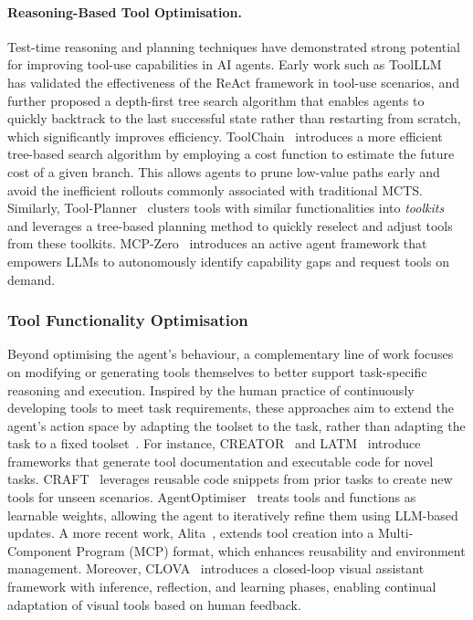 \documentclass[]{selfevolagent}
\theoremstyle{plain}
\theoremstyle{definition}
\theoremstyle{remark}
\begin{document}
\paragraph{Reasoning-Based Tool Optimisation.} 
Test-time reasoning and planning techniques have demonstrated strong potential for improving tool-use capabilities in AI agents. Early work such as ToolLLM~\citep{qin2024toolllm} has validated the effectiveness of the ReAct \citep{yao2023react} framework in tool-use scenarios, and further proposed a depth-first tree search algorithm that enables agents to quickly backtrack to the last successful state rather than restarting from scratch, which significantly improves efficiency. 
ToolChain~\citep{zhuang2024toolchain} introduces a more efficient tree-based search algorithm by employing a cost function to estimate the future cost of a given branch. This allows agents to prune low-value paths early and avoid the inefficient rollouts commonly associated with traditional MCTS. Similarly, Tool-Planner~\citep{liu2025toolplanner} clusters tools with similar functionalities into \textit{toolkits} and leverages a tree-based planning method to quickly reselect and adjust tools from these toolkits. MCP-Zero~\citep{fei2025mcp} introduces an active agent framework that empowers LLMs to autonomously identify capability gaps and request tools on demand.  

\subsubsection{Tool Functionality Optimisation}
Beyond optimising the agent's behaviour, a complementary line of work focuses on modifying or generating tools themselves to better support task-specific reasoning and execution. Inspired by the human practice of continuously developing tools to meet task requirements, these approaches aim to extend the agent's action space by adapting the toolset to the task, rather than adapting the task to a fixed toolset~\citep{wang2024trove}. For instance, CREATOR~\citep{qian2023creator} and LATM~\citep{cai2024large} introduce frameworks that generate tool documentation and executable code for novel tasks. CRAFT~\citep{yuan2024craft} leverages reusable code snippets from prior tasks to create new tools for unseen scenarios. AgentOptimiser~\citep{zhang2024offline} treats tools and functions as learnable weights, allowing the agent to iteratively refine them using LLM-based updates. A more recent work, Alita~\citep{qiu2025alita}, extends tool creation into a Multi-Component Program (MCP) format, which enhances reusability and environment management. Moreover, CLOVA~\citep{gao2024clova} introduces a closed-loop visual assistant framework with inference, reflection, and learning phases, enabling continual adaptation of visual tools based on human feedback. %
\end{document}
